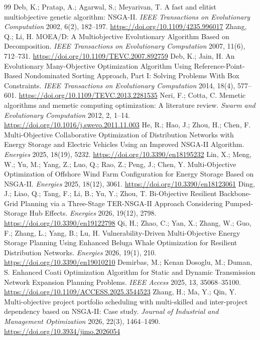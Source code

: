 \documentclass[applsci,article,submit,moreauthors]{Definitions/mdpi}
\begin{document}
\begin{thebibliography}{99}
 Deb, K.; Pratap, A.; Agarwal, S.; Meyarivan, T. A fast and elitist multiobjective genetic algorithm: NSGA-II. \emph{IEEE Transactions on Evolutionary Computation} 2002, 6(2), 182--197. \url{https://doi.org/10.1109/4235.996017}
 Zhang, Q.; Li, H. MOEA/D: A Multiobjective Evolutionary Algorithm Based on Decomposition. \emph{IEEE Transactions on Evolutionary Computation} 2007, 11(6), 712--731. \url{https://doi.org/10.1109/TEVC.2007.892759}
 Deb, K.; Jain, H. An Evolutionary Many-Objective Optimization Algorithm Using Reference-Point-Based Nondominated Sorting Approach, Part I: Solving Problems With Box Constraints. \emph{IEEE Transactions on Evolutionary Computation} 2014, 18(4), 577--601. \url{https://doi.org/10.1109/TEVC.2013.2281535}
 Neri, F.; Cotta, C. Memetic algorithms and memetic computing optimization: A literature review. \emph{Swarm and Evolutionary Computation} 2012, 2, 1--14. \url{https://doi.org/10.1016/j.swevo.2011.11.003}
 He, R.; Hao, J.; Zhou, H.; Chen, F. Multi-Objective Collaborative Optimization of Distribution Networks with Energy Storage and Electric Vehicles Using an Improved NSGA-II Algorithm. \emph{Energies} 2025, 18(19), 5232. \url{https://doi.org/10.3390/en18195232}
 Lin, X.; Meng, W.; Yu, M.; Yang, Z.; Luo, Q.; Rao, Z.; Peng, J.; Chen, Y. Multi-Objective Optimization of Offshore Wind Farm Configuration for Energy Storage Based on NSGA-II. \emph{Energies} 2025, 18(12), 3061. \url{https://doi.org/10.3390/en18123061}
 Ding, J.; Liao, Q.; Tang, F.; Li, B.; Yu, Y.; Zhou, T. Bi-Objective Resilient Backbone-Grid Planning via a Three-Stage TER-NSGA-II Approach Considering Pumped-Storage Hub Effects. \emph{Energies} 2026, 19(12), 2798. \url{https://doi.org/10.3390/en19122798}
 Qi, H.; Zhao, C.; Yan, X.; Zhang, W.; Guo, F.; Zhang, L.; Yang, B.; Lu, H. Vulnerability-Driven Multi-Objective Energy Storage Planning Using Enhanced Beluga Whale Optimization for Resilient Distribution Networks. \emph{Energies} 2026, 19(1), 210. \url{https://doi.org/10.3390/en19010210}
 Demirbas, M.; Kenan Dosoglu, M.; Duman, S. Enhanced Coati Optimization Algorithm for Static and Dynamic Transmission Network Expansion Planning Problems. \emph{IEEE Access} 2025, 13, 35068--35100. \url{https://doi.org/10.1109/ACCESS.2025.3544523}
 Zhang, H.; Ma, Y.; Qin, Y. Multi-objective project portfolio scheduling with multi-skilled and inter-project dependency based on NSGA-II: Case study. \emph{Journal of Industrial and Management Optimization} 2026, 22(3), 1464--1490. \url{https://doi.org/10.3934/jimo.2026054}

\end{thebibliography}
\end{document}
